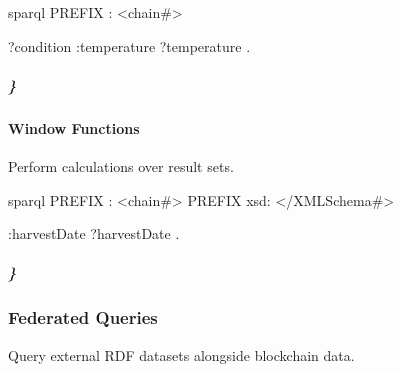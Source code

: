 \documentclass[letterpaper,10pt,english]{sphinxmanual}
\begin{document}
\sphinxAtStartPar
{}
{\color{red}\bfseries{}\textasciigrave{}\textasciigrave{}}{\color{red}\bfseries{}\textasciigrave{}}sparql
PREFIX : \textless{}\sphinxhyphen{}chain\#\textgreater{}
\begin{description}
\sphinxAtStartPar
?condition :temperature ?temperature .

\end{description}


\subparagraph{\}}
\label{\detokenize{api/sparql-api:id67}}

\paragraph{Window Functions}
\label{\detokenize{api/sparql-api:window-functions}}
\sphinxAtStartPar
Perform calculations over result sets.

\sphinxAtStartPar
{}
{\color{red}\bfseries{}\textasciigrave{}\textasciigrave{}}{\color{red}\bfseries{}\textasciigrave{}}sparql
PREFIX : \textless{}\sphinxhyphen{}chain\#\textgreater{}
PREFIX xsd: \textless{}/XMLSchema\#\textgreater{}
\begin{description}
\begin{description}
\sphinxAtStartPar
:harvestDate ?harvestDate .

\end{description}

\end{description}


\subparagraph{\}}
\label{\detokenize{api/sparql-api:id72}}

\subsubsection{Federated Queries}
\label{\detokenize{api/sparql-api:federated-queries}}
\sphinxAtStartPar
Query external RDF datasets alongside blockchain data.
\end{document}
